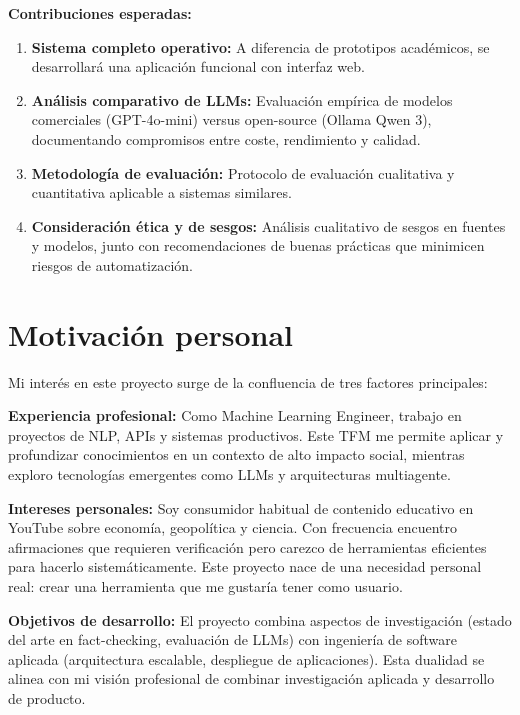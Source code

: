 \documentclass[12pt,a4paper]{article}
\begin{document}
\textbf{Contribuciones esperadas:}

\begin{enumerate}
    \item \textbf{Sistema completo operativo:} A diferencia de prototipos académicos, se desarrollará una aplicación funcional con interfaz web.

    \item \textbf{Análisis comparativo de LLMs:} Evaluación empírica de modelos comerciales (GPT-4o-mini) versus open-source (Ollama Qwen 3), documentando compromisos entre coste, rendimiento y calidad.

    \item \textbf{Metodología de evaluación:} Protocolo de evaluación cualitativa y cuantitativa aplicable a sistemas similares.

    \item \textbf{Consideración ética y de sesgos:} Análisis cualitativo de sesgos en fuentes y modelos, junto con recomendaciones de buenas prácticas que minimicen riesgos de automatización.
\end{enumerate}

\section{Motivación personal}

Mi interés en este proyecto surge de la confluencia de tres factores principales:

\textbf{Experiencia profesional:} Como Machine Learning Engineer, trabajo en proyectos de NLP, APIs y sistemas productivos. Este TFM me permite aplicar y profundizar conocimientos en un contexto de alto impacto social, mientras exploro tecnologías emergentes como LLMs y arquitecturas multiagente.

\textbf{Intereses personales:} Soy consumidor habitual de contenido educativo en YouTube sobre economía, geopolítica y ciencia. Con frecuencia encuentro afirmaciones que requieren verificación pero carezco de herramientas eficientes para hacerlo sistemáticamente. Este proyecto nace de una necesidad personal real: crear una herramienta que me gustaría tener como usuario.

\textbf{Objetivos de desarrollo:} El proyecto combina aspectos de investigación (estado del arte en fact-checking, evaluación de LLMs) con ingeniería de software aplicada (arquitectura escalable, despliegue de aplicaciones). Esta dualidad se alinea con mi visión profesional de combinar investigación aplicada y desarrollo de producto.
\end{document}
